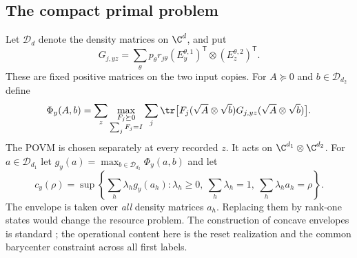 \subsection{The compact primal problem}
Let $\mathcal D_d$ denote the density matrices on $\C^d$, and put
\begin{equation}\label{eq:gameblocks91}
 G_{j,yz}=\sum_\theta p_\theta r_{j\theta}
     (E_y^{\theta,1})^{\mathsf T}\otimes(E_z^{\theta,2})^{\mathsf T}.
\end{equation}
These are fixed positive matrices on the two input copies.  For
$A\succeq0$ and $b\in\mathcal D_{d_2}$ define
\begin{equation}\label{eq:leafvalue91}
 \Phi_y(A,b)=\sum_z\max_{\substack{F_j\succeq0\\\sum_jF_j=I}}
 \sum_j\tr\bigl[F_j(\sqrt A\otimes\sqrt b)
            G_{j,yz}(\sqrt A\otimes\sqrt b)\bigr].
\end{equation}
The POVM is chosen separately at every recorded $z$.  It acts on
$\C^{d_1}\otimes\C^{d_2}$.  For $a\in\mathcal D_{d_1}$ let
$g_y(a)=\max_{b\in\mathcal D_{d_2}}\Phi_y(a,b)$ and let
\begin{equation}\label{eq:roof91}
 c_y(\rho)=\sup\left\{\sum_h\lambda_h g_y(a_h):
 \lambda_h\ge0,\ \sum_h\lambda_h=1,\
 \sum_h\lambda_ha_h=\rho\right\}.
\end{equation}
The envelope is taken over \emph{all} density matrices $a_h$.  Replacing
them by rank-one states would change the resource problem.  The
construction of concave envelopes is standard \cite{Uhlmann91}; the
operational content here is the reset realization and the common
barycenter constraint across all first labels.

